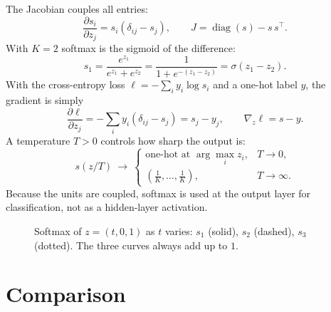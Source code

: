 \documentclass[11pt]{article}
\begin{document}
The Jacobian couples all entries:
\begin{equation}
  \frac{\partial s_i}{\partial z_j}=s_i(\delta_{ij}-s_j),
  \qquad
  J=\operatorname{diag}(s)-s\,s^\top .
\end{equation}
With $K=2$ softmax is the sigmoid of the difference:
\begin{equation}
  s_1=\frac{e^{z_1}}{e^{z_1}+e^{z_2}}=\frac{1}{1+e^{-(z_1-z_2)}}=\sigma(z_1-z_2).
  \label{eq:softmax-sigmoid}
\end{equation}
With the cross-entropy loss $\ell=-\sum_i y_i\log s_i$ and a one-hot label $y$, the gradient is simply
\begin{equation}
  \frac{\partial\ell}{\partial z_j}
  =-\sum_i y_i(\delta_{ij}-s_j)
  =s_j-y_j ,
  \qquad
  \nabla_z\ell=s-y .
\end{equation}
A temperature $T>0$ controls how sharp the output is:
\begin{equation}
  s(z/T)\ \longrightarrow\
  \begin{cases}
    \text{one-hot at } \arg\max_i z_i, & T\to0,\\
    \left(\tfrac1K,\dots,\tfrac1K\right), & T\to\infty .
  \end{cases}
\end{equation}
Because the units are coupled, softmax is used at the output layer for classification,
not as a hidden-layer activation.

\begin{figure}[H]
\centering
{}
\caption{Softmax of $z=(t,0,1)$ as $t$ varies: $s_1$ (solid), $s_2$ (dashed), $s_3$ (dotted). The three curves always add up to $1$.}
\end{figure}

\section{Comparison}
\end{document}
